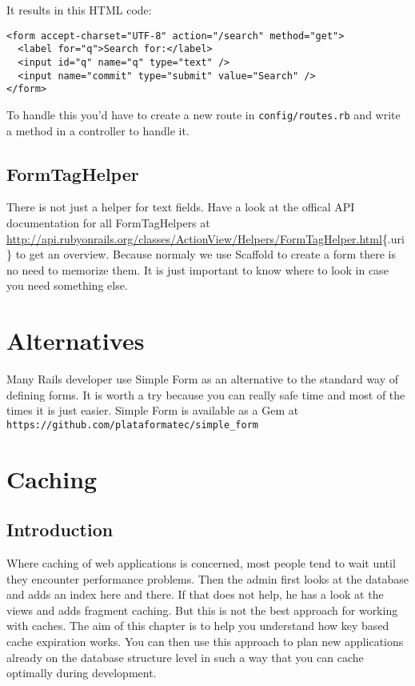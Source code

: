 \documentclass[a4paper]{book}
\newcounter{tab}[chapter]
\newcommand{\chap}[1]{\newpage\thispagestyle{empty}\chapter{#1}\label{chap:\thechapter}}
\begin{document}
It results in this HTML code:

\begin{shaded}\begin{verbatim}
<form accept-charset="UTF-8" action="/search" method="get">
  <label for="q">Search for:</label>
  <input id="q" name="q" type="text" />
  <input name="commit" type="submit" value="Search" />
</form>
\end{verbatim}\end{shaded}

To handle this you'd have to create a new route in \texttt{config/routes.rb} and write a method in a controller to handle it.

\section{FormTagHelper}\label{formtaghelper}

There is not just a helper for text fields. Have a look at the offical API documentation for all FormTagHelpers at \url{http://api.rubyonrails.org/classes/ActionView/Helpers/FormTagHelper.html}\{.uri\} to get an overview. Because normaly we use Scaffold to create a form there is no need to memorize them. It is just important to know where to look in case you need something else.

\chap{Alternatives}\label{alternatives}

Many Rails developer use Simple Form as an alternative to the standard way of defining forms. It is worth a try because you can really safe time and most of the times it is just easier. Simple Form is available as a Gem at \texttt{https://github.com/plataformatec/simple\_form}

\chap{Caching}\label{caching}

\section{Introduction}\label{introduction-7}

Where caching of web applications is concerned, most people tend to wait until they encounter performance problems. Then the admin first looks at the database and adds an index here and there. If that does not help, he has a look at the views and adds fragment caching. But this is not the best approach for working with caches. The aim of this chapter is to help you understand how key based cache expiration works. You can then use this approach to plan new applications already on the database structure level in such a way that you can cache optimally during development.
\end{document}
